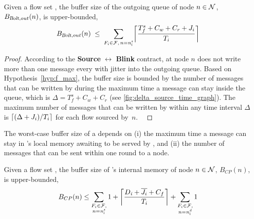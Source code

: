 \begin{lemma} \label{lem:buffer_bolt_out}
Given a flow set \flowset, the buffer size of the outgoing \bolt queue of node $n \in \nodeset$, $B_{\bolt,out}(n)$, is upper-bounded,
\begin{equation}
\label{eq:bolt_out_buffer_stress}
	B_{\bolt, out}(n) \; \leq \;
	\sum_{\substack{F_i\in \mathcal{F},\, n = \flowsrci}} \ceil*{\frac{T_f^s + C_w + C_r + \jitteri}{T_i}}
\end{equation}
\end{lemma}

\begin{proof}%
According to the \textbf{Source} $\boldsymbol{\leftrightarrow}$ \textbf{Blink} contract, \apsrc at node $n$ does not write more than one message every \periodi with jitter \jitteri into the outgoing \bolt queue.
Based on Hypothesis~\ref{hyp:f_max}, the buffer size is bounded by the number of messages that can be written by \apsrc during the maximum time a message can stay inside the queue, which is $\Delta = T_f^s + C_w + C_r$ (see \cref{fig:delta_source_time_graph}).
The maximum number of messages that can be written by \apsrc within any time interval $\Delta$ is $\ceil*{(\Delta + J_i)/{T_i}}$ for each flow \flowi sourced by~$n$. \
\end{proof}


The worst-case buffer size of a \cp depends on (i) the maximum time a message can stay in \cp's local memory awaiting to be served by \blink, and (ii) the number of messages that can be sent within one round to a node.

\begin{lemma} \label{lem:buffer_CP}
Given a flow set \flowset, the buffer size of {\cp}'s internal memory of node $n \in \nodeset$, $B_{CP}(n)$, is upper-bounded,
\begin{equation}
\label{eq:CP_memory_stress}
	B_{CP}(n) \leq
	\sum_{\substack{F_i\in \mathcal{F},\\ n = \flowsrci}}
	1 + \ceil*{\frac{\ndeadlinei + \overline{\jitteri} + C_f}{T_i}} +
	\sum_{\substack{F_i\in \mathcal{F},\\ n = \flowdsti}} 1
\end{equation}
\end{lemma}

